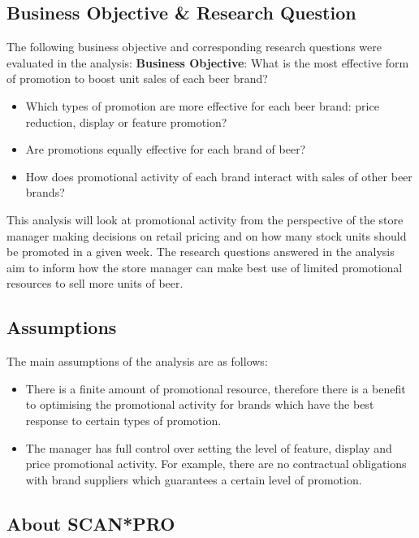 \documentclass[a4paper,11pt]{article}
\begin{document}
\subsection{Business Objective \& Research Question}
The following business objective and corresponding research questions were evaluated in the analysis:
\newline
\newline
\textbf{Business Objective}: What is the most effective form of promotion to boost unit sales of each beer brand?
\begin{itemize}
        \item Which types of promotion are more effective for each beer brand: price reduction, display or feature promotion?
        \item Are promotions equally effective for each brand of beer?
        \item How does promotional activity of each brand interact with sales of other beer brands?
\end{itemize}
\newline
\newline

This analysis will look at promotional activity from the perspective of the store manager making decisions on retail pricing and on how many stock units should be promoted in a given week. The research questions answered in the analysis aim to inform how the store manager can make best use of limited promotional resources to sell more units of beer. 

\subsection{Assumptions}

The main assumptions of the analysis are as follows:
\begin{itemize}
    \item There is a finite amount of promotional resource, therefore there is a benefit to optimising the promotional activity for brands which have the best response to certain types of promotion.
    \item The manager has full control over setting the level of feature, display and price promotional activity. For example, there are no contractual obligations with brand suppliers which guarantees a certain level of promotion.
\end{itemize}


\subsection{About SCAN*PRO}
\end{document}
